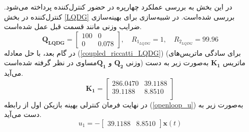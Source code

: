 



در این بخش به بررسی عملکرد چهارپره در حضور کنترل‌کننده  پرداخته می‌شود. کنترل‌کننده  در بخش
\ref{LQDG}
بررسی شده‌است.
 در شبیه‌سازی برای بهینه‌سازی ضرایب وزنی مانند قسمت قبل عمل شده‌است.
\begin{equation}
	\boldsymbol{Q_{LQDG}} = \begin{bmatrix}
		100 & 0\\
		0 & 0.078
	\end{bmatrix}, \quad R_{1_{LQDG}} =  1, \quad R_{2_{LQDG}} =  99.96
\end{equation}
در گام بعد، با حل معادله
(\ref{coupled_riccatti_LQDG})
(برای سادگی ماتریس‌های وزنی $\boldsymbol{{Q}_{2}}$ و $\boldsymbol{{Q}_{1}}$مساوی در نظر گرفته شده‌است)
ماتریس
$\boldsymbol{{K}_1}$
به‌صورت زیر به دست می‌آید.
\begin{equation}
	\boldsymbol{K_1} = \begin{bmatrix}
		
		286.0470  & 39.1188\\
		39.1188   & 8.8510\\
	\end{bmatrix}
\end{equation}
در نهایت فرمان کنترلی بهینه بازیکن اول از رابطه
(\ref{openloop_u})
به‌صورت زیر به دست می‌آید.
\begin{equation}
	u_1 = -\begin{bmatrix}
		39.1188   & 8.8510
	\end{bmatrix}\boldsymbol{x}(t)
\end{equation}


